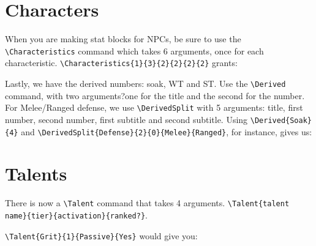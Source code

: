 \documentclass{book}
\begin{document}
\section{Characters}

When you are making stat blocks for NPCs, be sure to use the \verb|\Characteristics| command which takes 6 arguments, once for each characteristic. \verb|\Characteristics{1}{3}{2}{2}{2}{2}| grants:

\vspace{1em}

\vspace{1em}


\vspace{1em}


Lastly, we have the derived numbers: soak, WT and ST. Use the \verb|\Derived| command, with two arguments?one for the title and the second for the number. For Melee/Ranged defense, we use \verb|\DerivedSplit| with 5 arguments: title, first number, second number, first subtitle and second subtitle. Using \verb|\Derived{Soak}{4}| and \verb|\DerivedSplit{Defense}{2}{0}{Melee}{Ranged}|, for instance, gives us:

\vspace{1em}

\hspace*{\fill}\qquad{}\hspace*{\fill}

\section{Talents}

There is now a \verb|\Talent| command that takes 4 arguments. \verb|\Talent{talent name}{tier}{activation}{ranked?}|. 

\verb|\Talent{Grit}{1}{Passive}{Yes}| would give you: 

\end{document}
